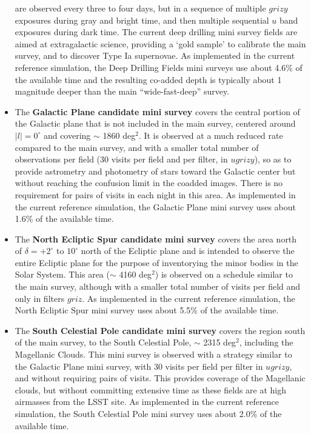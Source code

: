 \documentclass[DM,toc,usenatbib]{lsstdoc}
\begin{document}
\begin{itemize}
are observed every three to four days, but in a sequence of multiple $grizy$ exposures during gray and bright time, and then
multiple sequential $u$ band exposures during dark time. The current deep drilling mini survey fields are aimed at extragalactic
science, providing a `gold sample' to calibrate the main survey, and to discover Type Ia supernovae. 
As implemented in the current reference simulation, the Deep Drilling Fields mini surveys use about 4.6\% of the available time
and the resulting co-added depth is typically about 1 magnitude deeper than the main ``wide-fast-deep'' survey. 
\item The {\bf Galactic Plane candidate mini survey} covers the central portion of the Galactic plane that is not included in the main survey, 
centered around $|l| = 0^\circ$ and covering $\sim$ 1860 deg$^2$.  It is observed at a much reduced rate compared to the main survey, 
and with a smaller total number of observations per field (30 visits per field and per filter, in $ugrizy$), so as to
provide astrometry and photometry of stars toward the Galactic center but without reaching the confusion limit in the coadded images.
There is no requirement for pairs of visits in each night in this area. As implemented in the current reference simulation, the Galactic Plane mini survey uses
about 1.6\% of the available time.
\item The {\bf North Ecliptic Spur candidate mini survey} covers the area north of $\delta = +2^\circ$ to $10^\circ$ north of the Ecliptic plane
and is intended to observe the entire Ecliptic plane for the purpose of inventorying the minor bodies in the Solar System. This area ($\sim$ 4160 deg$^2$) 
is observed on a schedule similar to the main survey, although with a smaller total number of visits per field and only in filters $griz$. 
As implemented in the current reference simulation, the North Ecliptic Spur mini survey uses about 5.5\% of the available time. 
\item The {\bf South Celestial Pole candidate mini survey} covers the region south of the main survey, to the South Celestial Pole, $\sim$ 2315 deg$^2$,
including the Magellanic Clouds. 
This mini survey is observed with a strategy similar to the Galactic Plane mini survey, with 30 visits per field per filter in $ugrizy$, 
and without requiring pairs of visits. This provides coverage of the Magellanic clouds, but without committing extensive time as these fields are
at high airmasses from the LSST site. As implemented in the current reference simulation, the South Celestial Pole mini survey uses
about 2.0\% of the available time.
\end{itemize}
\end{document}
